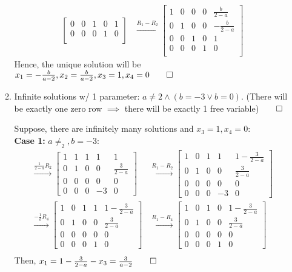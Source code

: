 \documentclass[12pt, a4paper]{article}
\begin{document}
\begin{enumerate}[Q\arabic*.]
\begin{enumerate}[(\alph*)]
\begin{align*}
\begin{bmatrix}
            0 & 0 & 1 & 0 & 1\\
            0 & 0 & 0 & 1 & 0\\
          \end{bmatrix}
          &\xrightarrow{R_1-R_2}
          \begin{bmatrix}
            1 & 0 & 0 & 0 & \frac{b}{2-a}\\
            0 & 1 & 0 & 0 & -\frac{b}{2-a}\\
            0 & 0 & 1 & 0 & 1\\
            0 & 0 & 0 & 1 & 0\\
          \end{bmatrix}
        \end{align*}
        Hence, the unique solution will be $x_1 = -\frac{b}{a-2}, x_2 = \frac{b}{a-2}, x_3 = 1, x_4 = 0 \qed$
      \item Infinite solutions w/ 1 parameter: $a \neq 2 \land (b=-3 \lor b = 0)$. (There will be exactly one zero row $\implies$ there will be exactly 1 free variable)$\qed$  

        Suppose, there are infinitely many solutions and $x_3 = 1, x_4 = 0$:\\
        \textbf{Case 1:} $a\neq_2, b=-3$:
        \begin{align*}
          \xrightarrow{\frac{1}{2-a}R_2}
          \begin{bmatrix}
            1&1&1&1&1\\
            0&1&0&0&\frac{3}{2-a}\\
            0&0&0&0&0\\
            0&0&0&-3&0
          \end{bmatrix}
          &\xrightarrow{R_1-R_2}
          \begin{bmatrix}
            1&0&1&1&1-\frac{3}{2-a}\\
            0&1&0&0&\frac{3}{2-a}\\
            0&0&0&0&0\\
            0&0&0&-3&0
          \end{bmatrix}\\
          \xrightarrow{-\frac{1}{b}R_4}
          \begin{bmatrix}
            1&0&1&1&1-\frac{3}{2-a}\\
            0&1&0&0&\frac{3}{2-a}\\
            0&0&0&0&0\\
            0&0&0&1&0
          \end{bmatrix}
          &\xrightarrow{R_1-R_4}
          \begin{bmatrix}
            1&0&1&0&1-\frac{3}{2-a}\\
            0&1&0&0&\frac{3}{2-a}\\
            0&0&0&0&0\\
            0&0&0&1&0
          \end{bmatrix}\\
        \end{align*}
        Then, $x_1 = 1 - \frac{3}{2-a} - x_3 = \frac{3}{a-2} \qed$  


\end{enumerate}
\end{enumerate}
\end{document}
